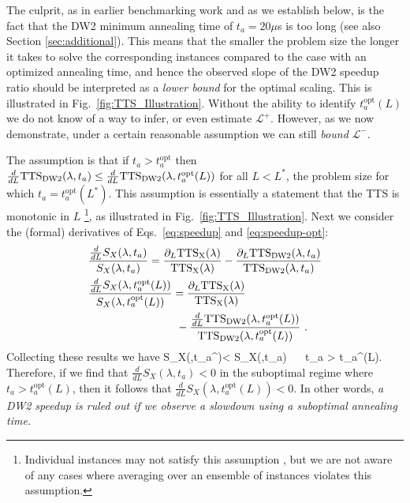 The culprit, as in earlier benchmarking work \cite{speedup} and as we establish below, is the fact that the DW2 minimum annealing time of $t_a=20 \mu$s is too long (see also Section \ref{sec:additional}). This means that the smaller the problem size the longer it takes to solve the corresponding instances compared to the case with an optimized annealing time, and hence the observed slope of the DW2 speedup ratio should be interpreted as a \emph{lower bound} for the optimal scaling. This is illustrated in Fig.~\ref{fig:TTS_Illustration}. Without the ability to identify $t_a^{\mathrm{opt}}(L)$ we do not know of a way to infer, or even estimate $\mathcal{L}^+$. However, as we now demonstrate, under a certain reasonable assumption we can still \emph{bound} $\mathcal{L}^-$.

The assumption is that if $t_a > t_a^{\mathrm{opt}}$ then  $\frac{d}{dL} \textrm{TTS}_{\mathrm{DW2}}(\lambda,t_a) \leq \frac{d}{dL}\textrm{TTS}_{\mathrm{DW2}}(\lambda,t_a^{\mathrm{opt}}(L))$ for all $L < L^*$, the problem size for which $t_a = t_a^{\mathrm{opt}}(L^*)$. This assumption is essentially a statement that the TTS is monotonic in $L$ \footnote{Individual instances may not satisfy this assumption \cite{Amin:2015qf,Albash:2015nx}, but we are not aware of any cases where averaging over an ensemble of instances violates this assumption.}, as illustrated in Fig.~\ref{fig:TTS_Illustration}. Next we consider the (formal) derivatives of Eqs.~\eqref{eq:speedup} and \eqref{eq:speedup-opt}:
%
\bes
\begin{align}
&\frac{\frac{d}{dL} S_X(\lambda,t_a)}{S_X(\lambda,t_a)} =  \frac{\partial_L \textrm{TTS}_\mathrm{X}(\lambda)}{\textrm{TTS}_\mathrm{X}(\lambda)}   -\frac{\partial_L \textrm{TTS}_{\mathrm{DW2}}(\lambda,t_a)}{\textrm{TTS}_{\mathrm{DW2}}(\lambda,t_a)} \\
&\frac{\frac{d}{dL} S_X(\lambda,t_a^{\mathrm{opt}}(L))}{S_X(\lambda,t_a^{\mathrm{opt}}(L))} =
\frac{\partial_L \textrm{TTS}_\mathrm{X}(\lambda)}{\textrm{TTS}_\mathrm{X}(\lambda)} \notag \\
&\qquad\qquad\qquad\qquad - \frac{\frac{d}{dL} \textrm{TTS}_{\mathrm{DW2}}(\lambda,t_a^{\mathrm{opt}}(L))}{\textrm{TTS}_{\mathrm{DW2}}(\lambda,t_a^{\mathrm{opt}}(L))} \ .
\end{align}
\ees
Collecting these results we have
%
\beq
\label{eq:rulingout}
   S_X(\lambda,t_a^{})< { S_X(\lambda,t_a)} \  \ t_a > t_a^{}(L). \notag \\
\eeq
%
Therefore, if we find that $\frac{d}{dL} S_X(\lambda,t_a)< 0$ in the suboptimal regime where $t_a > t_a^{\mathrm{opt}}(L)$, then it follows that $\frac{d}{dL} S_X(\lambda,t_a^{\mathrm{opt}}(L)) < 0$. In other words, \emph{a DW2 speedup is ruled out if we observe a slowdown using a suboptimal annealing time.}

